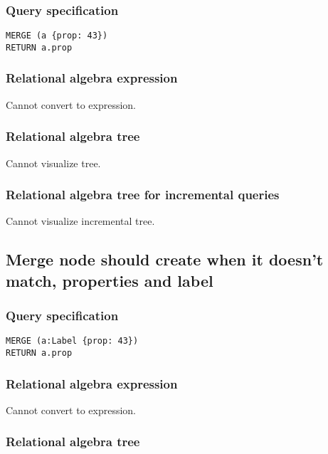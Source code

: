 \subsubsection*{Query specification}

\begin{lstlisting}
MERGE (a {prop: 43})
RETURN a.prop
\end{lstlisting}

\subsubsection*{Relational algebra expression}

Cannot convert to expression.

\subsubsection*{Relational algebra tree}

Cannot visualize tree.

\subsubsection*{Relational algebra tree for incremental queries}

Cannot visualize incremental tree.

\subsection{Merge node should create when it doesn't match, properties and label}

\subsubsection*{Query specification}

\begin{lstlisting}
MERGE (a:Label {prop: 43})
RETURN a.prop
\end{lstlisting}

\subsubsection*{Relational algebra expression}

Cannot convert to expression.

\subsubsection*{Relational algebra tree}

